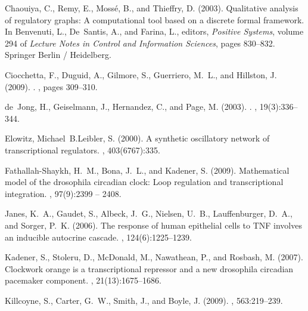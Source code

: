 \clearpage
{}
\begin{thebibliography}{}

Chaouiya, C., Remy, E., Moss\'{e}, B., and Thieffry, D. (2003).
\newblock Qualitative analysis of regulatory graphs: A computational tool based
  on a discrete formal framework.
\newblock In Benvenuti, L., De~Santis, A., and Farina, L., editors, {\em
  Positive Systems}, volume 294 of {\em Lecture Notes in Control and
  Information Sciences}, pages 830--832. Springer Berlin / Heidelberg.

Ciocchetta, F., Duguid, A., Gilmore, S., Guerriero, M.~L., and Hillston, J.
  (2009).
.
,
  pages 309--310.

de~Jong, H., Geiselmann, J., Hernandez, C., and Page, M. (2003).
.
, 19(3):336--344.

Elowitz, Michael~B.Leibler, S. (2000).
\newblock A synthetic oscillatory network of transcriptional regulators.
, 403(6767):335.

Fathallah-Shaykh, H.~M., Bona, J.~L., and Kadener, S. (2009).
\newblock Mathematical model of the drosophila circadian clock: Loop regulation
  and transcriptional integration.
, 97(9):2399 -- 2408.

Janes, K.~A., Gaudet, S., Albeck, J.~G., Nielsen, U.~B., Lauffenburger, D.~A.,
  and Sorger, P.~K. (2006).
\newblock The response of human epithelial cells to {TNF} involves an inducible
  autocrine cascade.
, 124(6):1225--1239.

Kadener, S., Stoleru, D., McDonald, M., Nawathean, P., and Rosbash, M. (2007).
\newblock Clockwork orange is a transcriptional repressor and a new drosophila
  circadian pacemaker component.
, 21(13):1675--1686.

Killcoyne, S., Carter, G.~W., Smith, J., and Boyle, J. (2009).
, 563:219--239.


\end{thebibliography}
